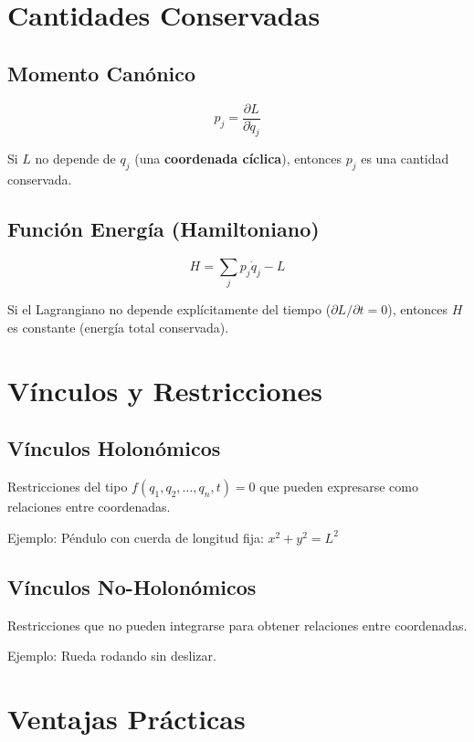 \section{Cantidades Conservadas}

\subsection*{Momento Canónico}

$$p_j = \frac{\partial L}{\partial \dot{q}_j}$$

Si $L$ no depende de $q_j$ (una \textbf{coordenada cíclica}), entonces $p_j$ es una cantidad conservada.

\subsection*{Función Energía (Hamiltoniano)}

$$H = \sum_j p_j \dot{q}_j - L$$

Si el Lagrangiano no depende explícitamente del tiempo ($\partial L/\partial t = 0$), entonces $H$ es constante (energía total conservada).

\section{Vínculos y Restricciones}

\subsection*{Vínculos Holonómicos}

Restricciones del tipo $f(q_1, q_2, \ldots, q_n, t) = 0$ que pueden expresarse como relaciones entre coordenadas.

Ejemplo: Péndulo con cuerda de longitud fija: $x^2 + y^2 = L^2$

\subsection*{Vínculos No-Holonómicos}

Restricciones que no pueden integrarse para obtener relaciones entre coordenadas.

Ejemplo: Rueda rodando sin deslizar.

\section{Ventajas Prácticas}

